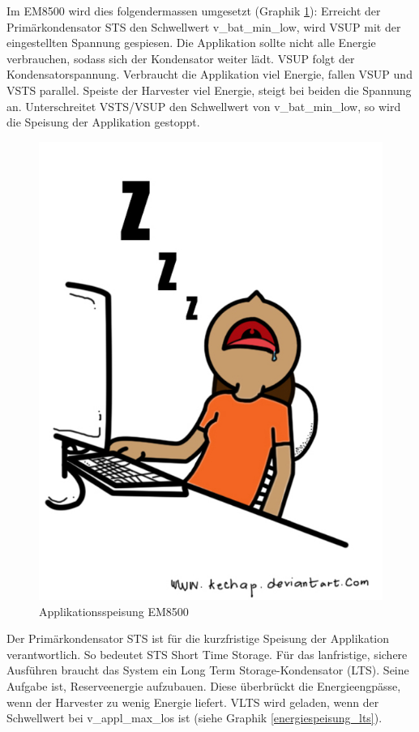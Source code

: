 Im EM8500 wird dies folgendermassen umgesetzt (Graphik \ref{em_grundprinzip_em8500}): Erreicht der Primärkondensator STS den Schwellwert v_bat_min_low, wird VSUP mit der eingestellten Spannung gespiesen. Die Applikation sollte nicht alle Energie verbrauchen, sodass sich der Kondensator weiter lädt. VSUP folgt der Kondensatorspannung. Verbraucht die Applikation viel Energie, fallen VSUP und VSTS parallel. Speiste der Harvester viel Energie, steigt bei beiden die Spannung an. Unterschreitet VSTS/VSUP den Schwellwert von v_bat_min_low, so wird die Speisung der Applikation gestoppt.\\


\begin{figure}
   \includegraphics{Idle.jpg}
   \caption{Applikationsspeisung EM8500 }\label{em_grundprinzip_em8500} 
\end{figure}

Der Primärkondensator STS ist für die kurzfristige Speisung der Applikation verantwortlich. So bedeutet STS Short Time Storage. Für das lanfristige, sichere Ausführen braucht das System ein Long Term Storage-Kondensator (LTS). Seine Aufgabe ist, Reserveenergie aufzubauen. Diese überbrückt die Energieengpässe, wenn der Harvester zu wenig Energie liefert.
VLTS wird geladen, wenn der Schwellwert bei v_appl_max_los ist (siehe Graphik \ref{energiespeisung_lts}).

